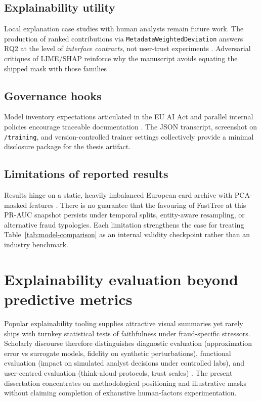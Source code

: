 \subsection{Explainability utility}
Local explanation case studies with human analysts remain future work. The production of ranked contributions via \texttt{MetadataWeightedDeviation} answers RQ2 at the level of \emph{interface contracts}, not user-trust experiments \cite{doshi_velez_kim_interpretability_2017}. Adversarial critiques of LIME/SHAP reinforce why the manuscript avoids equating the shipped mask with those families \cite{slack2020_fooling_lime_shap}.

\subsection{Governance hooks}
Model inventory expectations articulated in the EU AI Act and parallel internal policies encourage traceable documentation \cite{eu_ai_act2024,mitchell2019model_cards,gebru2021datasheets}. The JSON transcript, screenshot on \texttt{/training}, and version-controlled trainer settings collectively provide a minimal disclosure package for the thesis artifact.

\subsection{Limitations of reported results}
Results hinge on a static, heavily imbalanced European card archive with PCA-masked features \cite{credit_card_dataset,fraud_handbook}. There is no guarantee that the favouring of FastTree at this PR-AUC snapshot persists under temporal splits, entity-aware resampling, or alternative fraud typologies. Each limitation strengthens the case for treating Table~\ref{tab:model-comparison} as an internal validity checkpoint rather than an industry benchmark.

\section{Explainability evaluation beyond predictive metrics}
Popular explainability tooling supplies attractive visual summaries yet rarely ships with turnkey statistical tests of faithfulness under fraud-specific stressors. Scholarly discourse therefore distinguishes diagnostic evaluation (approximation error vs surrogate models, fidelity on synthetic perturbations), functional evaluation (impact on simulated analyst decisions under controlled labs), and user-centred evaluation (think-aloud protocols, trust scales) \cite{guidotti_blackbox_survey2018,xai_survey}. The present dissertation concentrates on methodological positioning and illustrative masks without claiming completion of exhaustive human-factors experimentation.

